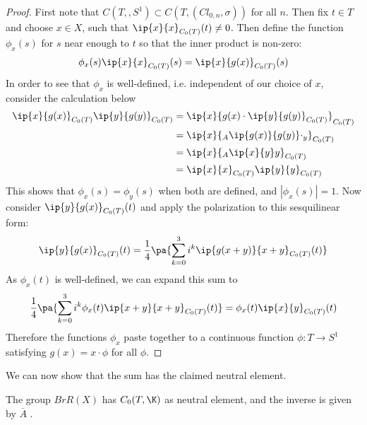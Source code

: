 \begin{proof}
	First note that $C(T,,S^1)\subset C(T,(Cl_{0,n},\sigma))$ for all $n$. 
	Then fix $t\in T$ and choose $x\in X$, such that $\ip{x}{x}_{C_0(T)}(t)\neq 0$. Then define the function $\phi_x(s)$ for $s$ near enough to $t$ so that the inner product is non-zero: 
	\begin{align*}
		\phi_x(s)\ip{x}{x}_{C_0(T)}(s)=\ip{x}{g(x)}_{C_0(T)}(s)
	\end{align*}
	In order to see that $\phi_x$ is well-defined, i.e. independent of our choice of $x$, consider the calculation below 
	\begin{align*}
		\ip{x}{g(x)}_{C_0(T)}\ip{y}{g(y)}_{C_0(T)}&=\ip{x}{g(x)\cdot \ip{y}{g(y)}_{C_0(T)}}_{C_0(T)} \\
		&=\ip{x}{{}_A\ip{g(x)}{g(y)}\cdot_y}_{C_0(T)} \\ 
		&=\ip{x}{{}_A\ip{x}{y}y}_{C_0(T)} \\
		&=\ip{x}{x}_{C_0(T)}\ip{y}{y}_{C_0(T)}
	\end{align*}
	This shows that $\phi_x(s)=\phi_y(s)$ when both are defined, and $|\phi_x(s)|=1$. Now consider $\ip{y}{g(x)}_{C_0(T)}(t)$ and apply the polarization to this sesquilinear form:
	\begin{align*}
		\ip{y}{g(x)}_{C_0(T)}(t)=\frac{1}{4}\pa{\sum_{k=0}^3 i^k\ip{g(x+y)}{x+y}_{C_0(T)}(t)} 
	\end{align*}
	As $\phi_x(t)$ is well-defined, we can expand this sum to 
	\begin{align*}
		\frac{1}{4}\pa{\sum_{k=0}^3 i^k\phi_x(t)\ip{x+y}{x+y}_{C_0(T)}(t)}=\phi_x(t)\ip{x}{y}_{C_0(T)}(t)
	\end{align*}
	Therefore the functions $\phi_x$ paste together to a continuous function $\phi: T\to S^1$ satisfying $g(x)=x \cdot \phi$ for all $\phi$.
\end{proof}
We can now show that the sum has the claimed neutral element. 
\begin{lemma}
	The group $BrR(X)$ has $C_0(T,\K)$ as neutral element, and the inverse is given by $\overline{A}$ .
\end{lemma}
